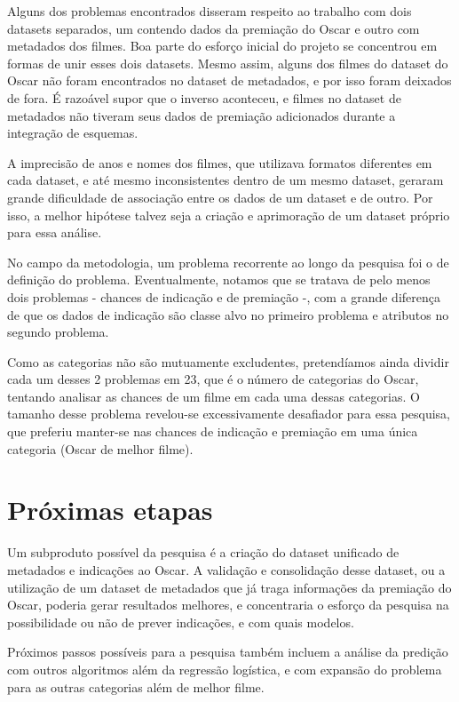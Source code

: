         Alguns dos problemas encontrados disseram respeito ao trabalho com dois datasets separados, um contendo dados da premiação do Oscar e outro com metadados dos filmes. Boa parte do esforço inicial do projeto se concentrou em formas de unir esses dois datasets. Mesmo assim, alguns dos filmes do dataset do Oscar não foram encontrados no dataset de metadados, e por isso foram deixados de fora. É razoável supor que o inverso aconteceu, e filmes no dataset de metadados não tiveram seus dados de premiação adicionados durante a integração de esquemas.
        
        A imprecisão de anos e nomes dos filmes, que utilizava formatos diferentes em cada dataset, e até mesmo inconsistentes dentro de um mesmo dataset, geraram grande dificuldade de associação entre os dados de um dataset e de outro. Por isso, a melhor hipótese talvez seja a criação e aprimoração de um dataset próprio para essa análise.
        
        No campo da metodologia, um problema recorrente ao longo da pesquisa foi o de definição do problema. Eventualmente, notamos que se tratava de pelo menos dois problemas - chances de indicação e de premiação -, com a grande diferença de que os dados de indicação são classe alvo no primeiro problema e atributos no segundo problema.
        
        Como as categorias não são mutuamente excludentes, pretendíamos ainda dividir cada um desses 2 problemas em 23, que é o número de categorias do Oscar, tentando analisar as chances de um filme em cada uma dessas categorias. O tamanho desse problema revelou-se excessivamente desafiador para essa pesquisa, que preferiu manter-se nas chances de indicação e premiação em uma única categoria (Oscar de melhor filme).
    
    \section[Próximas etapas da pesquisa]{Próximas etapas}
        Um subproduto possível da pesquisa é a criação do dataset unificado de metadados e indicações ao Oscar. A validação e consolidação desse dataset, ou a utilização de um dataset de metadados que já traga informações da premiação do Oscar, poderia gerar resultados melhores, e concentraria o esforço da pesquisa na possibilidade ou não de prever indicações, e com quais modelos.
        
        Próximos passos possíveis para a pesquisa também incluem a análise da predição com outros algoritmos além da regressão logística, e com expansão do problema para as outras categorias além de melhor filme.
